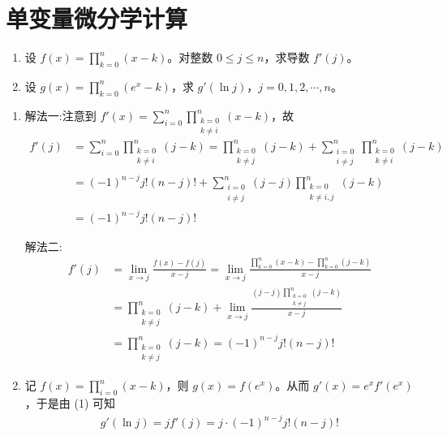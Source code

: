 \documentclass[../../main.tex]{subfiles}%
\begin{document}
\section{单变量微分学计算}

\begin{example}
\begin{enumerate}[(1)]
\item 设 \( f(x) = \prod_{k=0}^{n} (x - k) \)。对整数 \( 0 \leqslant j \leqslant n \)，求导数 \( f'(j) \)。

\item 设 \( g(x) = \prod_{k=0}^{n} (e^x - k) \)，求 \( g'(\ln j) \)，\( j = 0, 1, 2, \cdots, n \)。
\end{enumerate}
\end{example}
\begin{solution}
\begin{enumerate}[(1)]
\item {\color{blue} 解法一:}注意到 \( f'(x) = \sum_{i=0}^{n} \prod_{\substack{k=0 \\ k \neq i}}^{n} (x - k) \)，故
\begin{align*}
f'(j) &= \sum_{i=0}^{n} \prod_{\substack{k=0 \\ k \neq i}}^{n} (j - k) = \prod_{\substack{k=0 \\ k \neq j}}^{n} (j - k) + \sum_{\substack{i=0 \\ i \neq j}}^{n} \prod_{\substack{k=0 \\ k \neq i}}^{n} (j - k) \\
&= (-1)^{n - j} j! (n - j)! + \sum_{\substack{i=0 \\ i \neq j}}^{n} (j - j) \prod_{\substack{k=0 \\ k \neq i, j}}^{n} (j - k) \\
&= (-1)^{n - j} j! (n - j)!
\end{align*}

{\color{blue} 解法二:}\begin{align*}
f'(j) &= \lim_{x \to j} \frac{f(x) - f(j)}{x - j} = \lim_{x \to j} \frac{\prod\limits_{k=0}^{n} (x - k) - \prod\limits_{k=0}^{n} (j - k)}{x - j} \\
&= \prod_{\substack{k=0 \\ k \neq j}}^{n} (j - k) + \lim_{x \to j} \frac{(j - j) \prod\limits_{\substack{k=0 \\ k \neq j}}^{n} (j - k)}{x - j} \\
&= \prod_{\substack{k=0 \\ k \neq j}}^{n} (j - k) = (-1)^{n - j} j! (n - j)!
\end{align*}

\item 记 \( f(x) = \prod_{i=0}^{n} (x - k) \)，则 \( g(x) = f(e^x) \)。从而 \( g'(x) = e^x f'(e^x) \)，于是由 (1) 可知
\begin{align*}
g'(\ln j) = j f'(j) = j \cdot (-1)^{n - j} j! (n - j)!
\end{align*}
\end{enumerate}

\end{solution}
\end{document}
